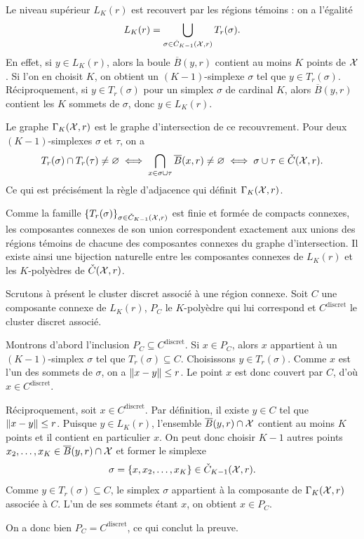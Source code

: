 \begin{Preuve}[{Preuve du \Th~\ref{th:cech_kpolyedres_knn}}]
Le niveau supérieur $L_K(r)$ est recouvert par les régions témoins : on a l'égalité
\[
    L_K(r)=\bigcup_{\sigma\in\check C_{K-1}(\mathcal{X},r)} T_r(\sigma).
\]
En effet, si $y\in L_K(r)$, alors la boule $\overline B(y,r)$ contient au moins $K$ points de $\mathcal{X}$. Si l'on en choisit $K$, on obtient un $(K-1)$-simplexe $\sigma$ tel que $y\in T_r(\sigma)$. Réciproquement, si $y\in T_r(\sigma)$ pour un simplex $\sigma$ de cardinal $K$, alors $\overline B(y,r)$ contient les $K$ sommets de $\sigma$, donc $y\in L_K(r)$.

Le graphe $\Gamma_K(\mathcal{X},r)$ est le graphe d'intersection de ce recouvrement.
Pour deux $(K-1)$-simplexes $\sigma$ et $\tau$, on a
\[
    T_r(\sigma)\cap T_r(\tau)\neq \varnothing
    \iff \bigcap_{x\in \sigma\cup\tau}\overline B(x,r)\neq \varnothing
    \iff \sigma\cup\tau\in \check C(\mathcal{X},r).
\]
Ce qui est précisément la règle d'adjacence qui définit $\Gamma_K(\mathcal{X},r)$.

Comme la famille $\{T_r(\sigma)\}_{\sigma\in\check C_{K-1}(\mathcal{X},r)}$ est finie et formée de compacts connexes, les composantes connexes de son union correspondent exactement aux unions des régions témoins de chacune des composantes connexes du graphe d'intersection. 
Il existe ainsi une bijection naturelle entre les composantes connexes de $L_K(r)$ et les $K$-polyèdres de $\check C(\mathcal{X},r)$.

Scrutons à présent le cluster discret associé à une région connexe.
Soit $C$ une composante connexe de $L_K(r)$, $P_C$ le $K$-polyèdre qui lui correspond et $C^{\mathrm{discret}}$ le cluster discret associé.

Montrons d'abord l'inclusion $P_C\subseteq C^{\mathrm{discret}}$. Si $x\in P_C$, alors $x$ appartient à un $(K-1)$-simplex $\sigma$ tel que $T_r(\sigma)\subseteq C$. Choisissons $y\in T_r(\sigma)$. Comme $x$ est l'un des sommets de $\sigma$, on a $\lVert x-y \rVert\le r$. Le point $x$ est donc couvert par $C$, d'où $x\in C^{\mathrm{discret}}$.

Réciproquement, soit $x\in C^{\mathrm{discret}}$. Par définition, il existe $y\in C$ tel que $\lVert x-y \rVert\le r$. Puisque $y\in L_K(r)$, l'ensemble $\overline B(y,r)\cap \mathcal{X}$ contient au moins $K$ points et il contient en particulier $x$. On peut donc choisir $K-1$ autres points $x_2,\ldots,x_K\in \overline B(y,r)\cap \mathcal{X}$ et former le simplexe
\[
    \sigma = \{x,x_2,\ldots,x_K\}\in \check C_{K-1}(\mathcal{X},r).
\]
Comme $y\in T_r(\sigma)\subseteq C$, le simplex $\sigma$ appartient à la composante de $\Gamma_K(\mathcal{X},r)$ associée à $C$. L'un de ses sommets étant $x$, on obtient $x\in P_C$.

On a donc bien $P_C=C^{\mathrm{discret}}$, ce qui conclut la preuve.
\end{Preuve}

